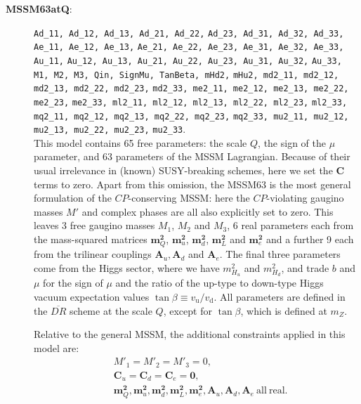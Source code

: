 \documentclass[pdftex,twocolumn,epjc3_preprint,runningheads]{svjour3}
\renewcommand{\_}{\discretionary{\underscore}{}{\underscore}}
\newcommand\term[1]{{\lstset{style=terminal}\lstinline!#1!\lstset{style=cpp}}}
\newcommand{\gsfitemc}[1]{\item[\textbf{\textsf{#1}}\label{#1}:]}
\newcommand{\DR}{$\overline{DR}$\xspace}
\newcommand{\DRbar}{\DR}
\begin{document}
\begin{description}
\gsfitemc{MSSM63atQ} \term{Ad_11, Ad_12, Ad_13, Ad_21, Ad_22,}
                     \term{Ad_23, Ad_31, Ad_32, Ad_33, Ae_11, Ae_12, Ae_13,}
                     \term{Ae_21, Ae_22, Ae_23, Ae_31, Ae_32, Ae_33, Au_11,}
                     \term{Au_12, Au_13, Au_21, Au_22, Au_23, Au_31, Au_32,}
                     \term{Au_33, M1, M2, M3, Qin, SignMu, TanBeta, mHd2,}
                     \term{mHu2, md2_11, md2_12, md2_13, md2_22, md2_23,}
                     \term{md2_33, me2_11, me2_12, me2_13, me2_22, me2_23,}
                     \term{me2_33, ml2_11, ml2_12, ml2_13, ml2_22, ml2_23,}
                     \term{ml2_33, mq2_11, mq2_12, mq2_13, mq2_22, mq2_23,}
                     \term{mq2_33, mu2_11, mu2_12, mu2_13, mu2_22, mu2_23,}
                     \term{mu2_33}.\\
This model contains 65 free parameters: the scale $Q$, the sign of the $\mu$ parameter, and 63 parameters of the MSSM Lagrangian.   Because of their usual irrelevance in (known) SUSY-breaking schemes, here we set the $\mathbf{C}$ terms to zero.  Apart from this omission, the MSSM63 is the most general formulation of the $CP$-conserving MSSM: here the $CP$-violating gaugino masses $M'$ and complex phases are all also explicitly set to zero.  This leaves 3 free gaugino masses $M_1$, $M_2$ and $M_3$, 6 real parameters each from the mass-squared matrices $\mathbf{m}^\mathbf{2}_Q$, $\mathbf{m}^\mathbf{2}_u$, $\mathbf{m}^\mathbf{2}_d$, $\mathbf{m}^\mathbf{2}_L$ and $\mathbf{m}^\mathbf{2}_e$ and a further 9 each from the trilinear couplings $\mathbf{A}_u, \mathbf{A}_d$ and $\mathbf{A}_e$.  The final three parameters come from the Higgs sector, where we have $m^2_{H_u}$ and $m^2_{H_d}$, and trade $b$ and $\mu$ for the sign of $\mu$ and the ratio of the up-type to down-type Higgs vacuum expectation values $\tan\beta\equiv v_\mathrm{u}/v_\mathrm{d}$.  All parameters are defined in the \DRbar scheme at the scale $Q$, except for $\tan\beta$, which is defined at $m_Z$.

\quad Relative to the general MSSM, the additional constraints applied in this model are:
\begin{align}
&M'_1 = M'_2 = M'_3 = 0,\\
&\mathbf{C}_u = \mathbf{C}_d = \mathbf{C}_e = \mathbf{0},\\
&\mathbf{m}^\mathbf{2}_Q, \mathbf{m}^\mathbf{2}_u, \mathbf{m}^\mathbf{2}_d, \mathbf{m}^\mathbf{2}_L, \mathbf{m}^\mathbf{2}_e, \mathbf{A}_u, \mathbf{A}_d, \mathbf{A}_e\ \mathrm{all~real}.
\end{align}


\end{description}
\end{document}
